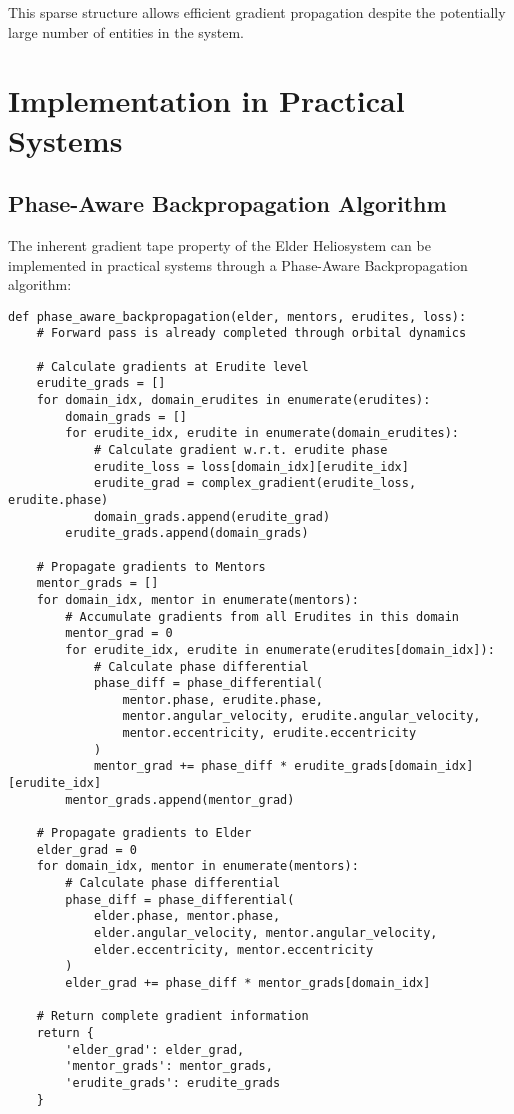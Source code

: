 This sparse structure allows efficient gradient propagation despite the potentially large number of entities in the system.

\section{Implementation in Practical Systems}

\subsection{Phase-Aware Backpropagation Algorithm}

The inherent gradient tape property of the Elder Heliosystem can be implemented in practical systems through a Phase-Aware Backpropagation algorithm:

\begin{tcolorbox}[colback=CodeBackground, colframe=DarkGray, title=Phase-Aware Backpropagation Algorithm, fonttitle=\bfseries]
\begin{verbatim}
def phase_aware_backpropagation(elder, mentors, erudites, loss):
    # Forward pass is already completed through orbital dynamics
    
    # Calculate gradients at Erudite level
    erudite_grads = []
    for domain_idx, domain_erudites in enumerate(erudites):
        domain_grads = []
        for erudite_idx, erudite in enumerate(domain_erudites):
            # Calculate gradient w.r.t. erudite phase
            erudite_loss = loss[domain_idx][erudite_idx]
            erudite_grad = complex_gradient(erudite_loss, erudite.phase)
            domain_grads.append(erudite_grad)
        erudite_grads.append(domain_grads)
    
    # Propagate gradients to Mentors
    mentor_grads = []
    for domain_idx, mentor in enumerate(mentors):
        # Accumulate gradients from all Erudites in this domain
        mentor_grad = 0
        for erudite_idx, erudite in enumerate(erudites[domain_idx]):
            # Calculate phase differential
            phase_diff = phase_differential(
                mentor.phase, erudite.phase,
                mentor.angular_velocity, erudite.angular_velocity,
                mentor.eccentricity, erudite.eccentricity
            )
            mentor_grad += phase_diff * erudite_grads[domain_idx][erudite_idx]
        mentor_grads.append(mentor_grad)
    
    # Propagate gradients to Elder
    elder_grad = 0
    for domain_idx, mentor in enumerate(mentors):
        # Calculate phase differential
        phase_diff = phase_differential(
            elder.phase, mentor.phase,
            elder.angular_velocity, mentor.angular_velocity,
            elder.eccentricity, mentor.eccentricity
        )
        elder_grad += phase_diff * mentor_grads[domain_idx]
    
    # Return complete gradient information
    return {
        'elder_grad': elder_grad,
        'mentor_grads': mentor_grads,
        'erudite_grads': erudite_grads
    }
\end{verbatim}
\end{tcolorbox}

